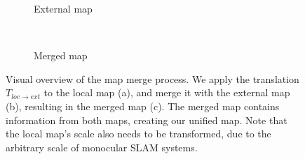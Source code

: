 \begin{figure}[h]
\begin{subfigure}[t]{0.35\linewidth}
        \centering
        \caption{External map}
    \end{subfigure}%
    ~
    \begin{subfigure}[t]{0.4\linewidth}
        \centering
        \caption{Merged map}
    \end{subfigure}%

    \caption{Visual overview of the map merge process. We apply the translation $T_{loc \to ext}$ to the local map (a), and merge it with the external map (b), resulting in the merged map (c). The merged map contains information from both maps, creating our unified map. Note that the local map's scale also needs to be transformed, due to the arbitrary scale of monocular SLAM systems.}
    \label{fig:map-merge}

\end{figure}


